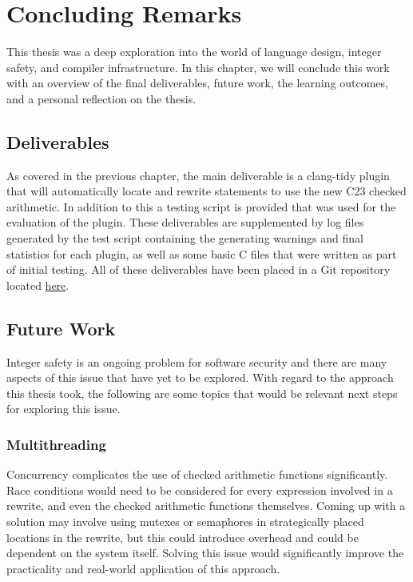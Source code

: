 \chapter{Concluding Remarks}
\label{sec:conclusion}

This thesis was a deep exploration into the world of language design, integer safety, and compiler infrastructure. In this chapter, we will conclude this work with an overview of the final deliverables, future work, the learning outcomes, and a personal reflection on the thesis.

\section{Deliverables}

As covered in the previous chapter, the main deliverable is a clang-tidy plugin that will automatically locate and rewrite statements to use the new C23 checked arithmetic. In addition to this a testing script is provided that was used for the evaluation of the plugin. These deliverables are supplemented by log files generated by the test script containing the generating warnings and final statistics for each plugin, as well as some basic C files that were written as part of initial testing. All of these deliverables have been placed in a Git repository located \href{https://github.com/stock1218/thesis}{here}.

\section{Future Work}

Integer safety is an ongoing problem for software security and there are many aspects of this issue that have yet to be explored. With regard to the approach this thesis took, the following are some topics that would be relevant next steps for exploring this issue.

\subsection{Multithreading}

Concurrency complicates the use of checked arithmetic functions significantly. Race conditions would need to be considered for every expression involved in a rewrite, and even the checked arithmetic functions themselves. Coming up with a solution may involve using mutexes or semaphores in strategically placed locations in the rewrite, but this could introduce overhead and could be dependent on the system itself. Solving this issue would significantly improve the practicality and real-world application of this approach.

